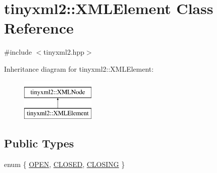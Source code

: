 \hypertarget{classtinyxml2_1_1_x_m_l_element}{\section{tinyxml2\-:\-:X\-M\-L\-Element Class Reference}
\label{classtinyxml2_1_1_x_m_l_element}
}


{\ttfamily \#include $<$tinyxml2.\-hpp$>$}

Inheritance diagram for tinyxml2\-:\-:X\-M\-L\-Element\-:\begin{figure}[H]
\begin{center}
\leavevmode
\includegraphics[height=2.000000cm]{classtinyxml2_1_1_x_m_l_element}
\end{center}
\end{figure}
\subsection*{Public Types}
\begin{DoxyCompactItemize}
\item 
enum \{ \hyperlink{classtinyxml2_1_1_x_m_l_element_a07a6ce25c17aaa505933db57f2373e50a78cf277c55b4655c86458dfecb11d349}{O\-P\-E\-N}, 
\hyperlink{classtinyxml2_1_1_x_m_l_element_a07a6ce25c17aaa505933db57f2373e50aa2f1f384020d2d4538ad2ec84930a028}{C\-L\-O\-S\-E\-D}, 
\hyperlink{classtinyxml2_1_1_x_m_l_element_a07a6ce25c17aaa505933db57f2373e50aa2857344b98a931536c443cd0cadc4b7}{C\-L\-O\-S\-I\-N\-G}
 \}
\end{DoxyCompactItemize}
